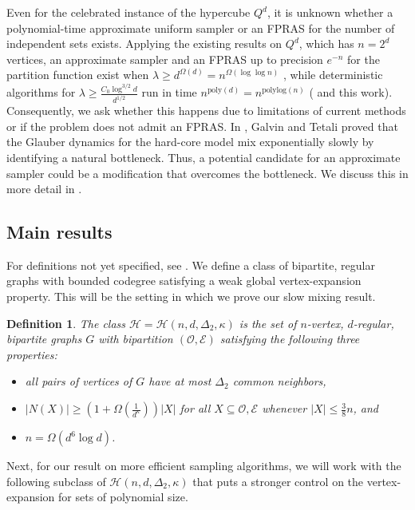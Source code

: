 \documentclass[reqno,a4paper,11pt]{amsart}
\newtheorem{definition}[theorem]{Definition}
\newcommand{\cE}{\mathcal{E}}
\newcommand{\cH}{\mathcal{H}}
\newcommand{\cO}{\mathcal{O}}
\newcommand{\lam}{\lambda}
\newcommand{\Om}{\Omega}
\newcommand{\ex}{\kappa}
\newcommand{\codeg}{\Delta_2}
\begin{document}
Even for the celebrated instance of the hypercube $Q^d$, it is unknown whether a polynomial-time approximate uniform sampler or an FPRAS for the number of independent sets exists. Applying the existing results on $Q^d$, which has $n=2^d$ vertices, an approximate sampler and an FPRAS up to precision $e^{-n}$ for the partition function exist when $\lam\geq d^{\Om(d)}=n^{\Om(\log\log n)}$ \cite[Theorem 11]{CheGaGoPeSteVi21}, while deterministic algorithms for $\lam\geq \frac{C_0 \log^{3/2}d}{d^{1/2}}$ run in time $n^{\text{poly}(d)}=n^{\text{polylog}(n)}$ (\cite{jenssen2024refined,JePePo23} and this work). Consequently, we ask whether this happens due to limitations of current methods or if the problem does not admit an FPRAS. In \cite{GaTe2006}, Galvin and Tetali proved that the Glauber dynamics for the hard-core model mix exponentially slowly by identifying a natural bottleneck. Thus, a potential candidate for an approximate sampler could be a modification that overcomes the bottleneck. We discuss this in more detail in .

\subsection{Main results}

For definitions not yet specified, see . We define a class of bipartite, regular graphs with bounded codegree satisfying a weak global vertex-expansion property. This will be the setting in which we prove our slow mixing result.


\begin{definition}\label{def:H}
    The class $\cH=\cH(n, d, \codeg, \ex)$ is the set of $n$-vertex, $d$-regular, bipartite graphs $G$ with bipartition $(\cO, \cE)$ satisfying the following three properties:
    \begin{itemize}
        \item[(1)] all pairs of vertices of $G$ have at most $\codeg$ common neighbors,
        \item[(2)] $|N(X)| \geq \left(1+\Omega\left(\frac{1}{d^{\ex}}\right)\right)|X|$ for all $X \subseteq \cO, \cE$ whenever $|X| \leq \frac{3}{8}n$, and
        \item[(3)] $n=\Om(d^6\log d)$.
    \end{itemize}
\end{definition}

Next, for our result on more efficient sampling algorithms, we will work with the following subclass of $\cH(n, d, \codeg, \ex)$ that puts a stronger control on the vertex-expansion for sets of polynomial size. 
\end{document}
